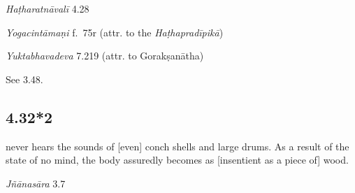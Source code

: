 \begin{ekdosis}
\begin{testimonia}[hp04_032_1]
\emph{Haṭharatnāvalī} 4.28
\begin{versinnote}
\end{versinnote}

\emph{Yogacintāmaṇi} f.~75r (attr. to the \emph{Haṭhapradīpikā})
\begin{versinnote}
\end{versinnote}

\emph{Yuktabhavadeva} 7.219 (attr. to Gorakṣanātha)
\begin{versinnote}
\end{versinnote}

\end{testimonia}

\begin{philcomm}[hp04_032_1]
See 3.48.
\end{philcomm}

\subsection*{4.32*2}
\begin{translation} never hears the sounds of [even] conch shells and large drums. As a result of the state of no mind, the body assuredly becomes as [insentient as a piece of] wood.
\end{translation}
%

\begin{sources}[hp04_032_2]
\emph{Jñānasāra} 3.7
\begin{versinnote}
\end{versinnote}
\end{sources}


\end{ekdosis}
